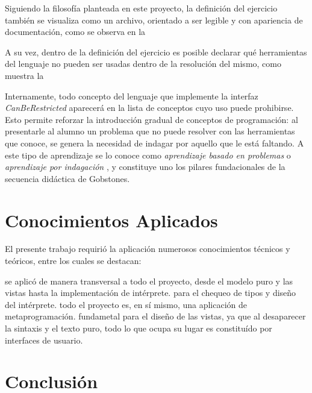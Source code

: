 Siguiendo la filosofía planteada en este proyecto, la definición del ejercicio también se visualiza como un archivo, orientado a ser legible y con apariencia de documentación, como se observa en la 


A su vez, dentro de la definición del ejercicio es posible declarar qué herramientas del lenguaje no pueden ser usadas dentro de la resolución del mismo, como muestra la 


Internamente, todo concepto del lenguaje que implemente la interfaz \textit{CanBeRestricted} aparecerá en la lista de conceptos cuyo uso puede prohibirse. Esto permite reforzar la introducción gradual de conceptos de programación: al presentarle al alumno un problema que no puede resolver con las herramientas que conoce, se genera la necesidad de indagar por aquello que le está faltando. A este tipo de aprendizaje se lo conoce como \textit{aprendizaje basado en problemas} o \textit{aprendizaje por indagación} \cite{Inquiry}, y constituye uno los pilares fundacionales de la secuencia didáctica de Gobstones.


\section{Conocimientos Aplicados}\label{conocimientos}

El presente trabajo requirió la aplicación numerosos conocimientos técnicos y teóricos, entre los cuales se destacan:

\begin{itemize}
   se aplicó de manera transversal a todo el proyecto, desde el modelo puro y las vistas hasta la implementación de intérprete.
   para el chequeo de tipos y diseño del intérprete.
   todo el proyecto es, en sí mismo, una aplicación de metaprogramación.
   fundametal para el diseño de las vistas, ya que al desaparecer la sintaxis y el texto puro, todo lo que ocupa su lugar es constituído por interfaces de usuario.
\end{itemize}


\section{Conclusión}\label{conclusion}

